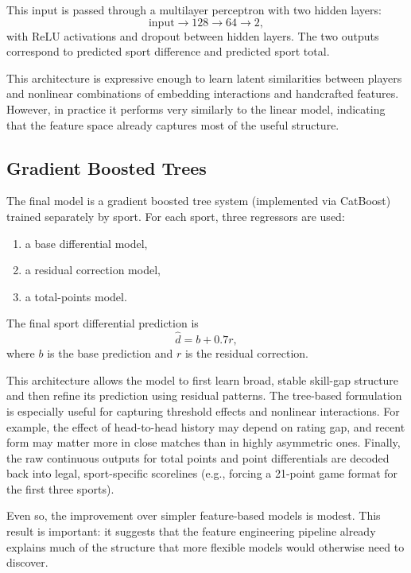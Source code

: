 \documentclass[10pt,twocolumn]{article}
\begin{document}
This input is passed through a multilayer perceptron with two hidden layers:
\[
    \text{input} \rightarrow 128 \rightarrow 64 \rightarrow 2,
\]
with ReLU activations and dropout between hidden layers. The two outputs correspond to predicted sport difference and predicted sport total.

This architecture is expressive enough to learn latent similarities between players and nonlinear combinations of embedding interactions and handcrafted features. However, in practice it performs very similarly to the linear model, indicating that the feature space already captures most of the useful structure.

\subsection{Gradient Boosted Trees}

The final model is a gradient boosted tree system (implemented via CatBoost) trained separately by sport. For each sport, three regressors are used:
\begin{enumerate}[leftmargin=1.2em,itemsep=0.25em]
    \item a base differential model,
    \item a residual correction model,
    \item a total-points model.
\end{enumerate}

The final sport differential prediction is
\[
    \hat d = b + 0.7r,
\]
where $b$ is the base prediction and $r$ is the residual correction.

This architecture allows the model to first learn broad, stable skill-gap structure and then refine its prediction using residual patterns. The tree-based formulation is especially useful for capturing threshold effects and nonlinear interactions. For example, the effect of head-to-head history may depend on rating gap, and recent form may matter more in close matches than in highly asymmetric ones. Finally, the raw continuous outputs for total points and point differentials are decoded back into legal, sport-specific scorelines (e.g., forcing a 21-point game format for the first three sports).

Even so, the improvement over simpler feature-based models is modest. This result is important: it suggests that the feature engineering pipeline already explains much of the structure that more flexible models would otherwise need to discover.

\end{document}
